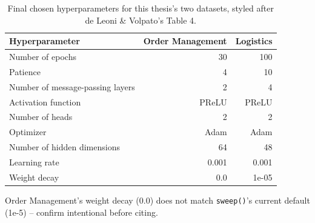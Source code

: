 \begin{table}[htbp]
\centering
\caption{Final chosen hyperparameters for this thesis's two datasets, styled after de Leoni \& Volpato's Table 4.}
\label{tab:final_hyperparameters}
\begin{tabular}{lrr}
\toprule
Hyperparameter & Order Management & Logistics \\
\midrule
Number of epochs & 30 & 100 \\
Patience & 4 & 10 \\
Number of message-passing layers & 2 & 4 \\
Activation function & PReLU & PReLU \\
Number of heads & 2 & 2 \\
Optimizer & Adam & Adam \\
Number of hidden dimensions & 64 & 48 \\
Learning rate & 0.001 & 0.001 \\
Weight decay & 0.0 & 1e-05 \\
\bottomrule
\end{tabular}
\vspace{2pt}
\footnotesize{Order Management's weight decay (0.0) does not match \texttt{sweep()}'s current default (1e-5) -- confirm intentional before citing.}
\end{table}
